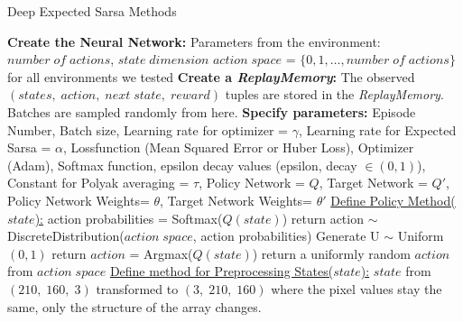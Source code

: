 \documentclass{article}
\begin{document}
\begin{algorithm}
\begin{algorithmic}
  \end{algorithmic}

\end{algorithm}

\begin{algorithm}
    \begin{algorithmic}[1]
    \caption{Deep Expected Sarsa Methods}
    \State \textbf{Create the Neural Network:}
    \State Parameters from the environment: $number\;of\;actions$, $state\;dimension$
    \State $action\;space$ = $\{0,1,\dots,number\;of\;actions\}$ for all environments we tested
    \State \textbf{Create a \textit{ReplayMemory}:}
    \State The observed $(states,\;action,\;next\;state,\;reward)$ tuples are stored in the \textit{ReplayMemory}. Batches are sampled randomly from here.
    \State \textbf{Specify parameters:}
    \State Episode Number, Batch size, Learning rate for optimizer = $\gamma$, Learning rate for Expected Sarsa = $\alpha$, Loss\;function (Mean Squared Error or Huber Loss), Optimizer (Adam), Softmax function, epsilon decay values (epsilon, decay $\in(0,1)$), Constant for Polyak averaging = $\tau$, Policy Network = $Q$, Target Network = $Q'$, Policy Network Weights= $\theta$, Target Network Weights= $\theta'$
    \newline
    \State \underline{Define Policy Method($state$):}
        \State action probabilities = Softmax($Q(state)$)
        \State return action $\sim$ DiscreteDistribution($action\;space$, action probabilities)
        Generate U $\sim$ Uniform$(0,1)$
            \State return $action$ = Argmax($Q(state)$)
        \Else
            \State return a uniformly random $action$ from $action\;space$
        \EndIf
    \EndIf
    \newline
    \State \underline{Define method for Preprocessing States($state$):}
        \State $state$ from $(210,\;160,\;3)$ transformed to $(3,\;210,\;160)$ where the pixel values stay the same, only the structure of the array changes.

\end{algorithmic}
\end{algorithm}
\end{document}
